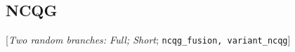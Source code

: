 \documentclass[12pt,english]{article}
\begin{document}
\begin{bibunit}
 \subsection*{NCQG} 
 [\textit{Two random branches: Full; Short}; %
 \verb|ncqg_fusion, variant_ncqg|] 
 \begin{enumerate}[resume] 


\end{enumerate}
\end{bibunit}
\end{document}
